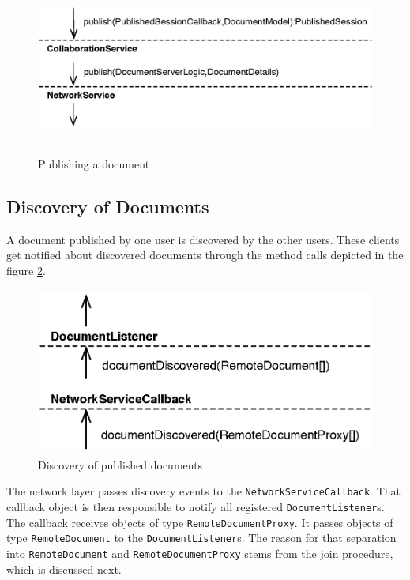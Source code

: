 \begin{figure}[H]
 \centering
 \includegraphics[width=15.70cm,height=5.72cm]{../images/finalreport/architecture_flows/publish.eps}
 \caption{Publishing a document}
 \label{fig:archoverview.flow.publish}
\end{figure}


\subsection{Discovery of Documents}
\label{sect:archoverview.flow.discovery}
A document published by one user is discovered by the other users. These
clients get notified about discovered documents through the method calls
depicted in the figure \ref{fig:archoverview.flow.discovery}.

\begin{figure}[H]
 \centering
 \includegraphics[width=11.84cm,height=5.50cm]{../images/finalreport/architecture_flows/discovery.eps}
 \caption{Discovery of published documents}
 \label{fig:archoverview.flow.discovery}
\end{figure}

The network layer passes discovery events to the 
\texttt{NetworkServiceCallback}. That callback object is then responsible
to notify all registered \texttt{DocumentListener}s. The callback receives
objects of type \texttt{RemoteDocumentProxy}. It passes objects of type
\texttt{RemoteDocument} to the \texttt{DocumentListener}s. The reason
for that separation into \texttt{RemoteDocument} and 
\texttt{RemoteDocumentProxy} stems from the join procedure, which is
discussed next.


